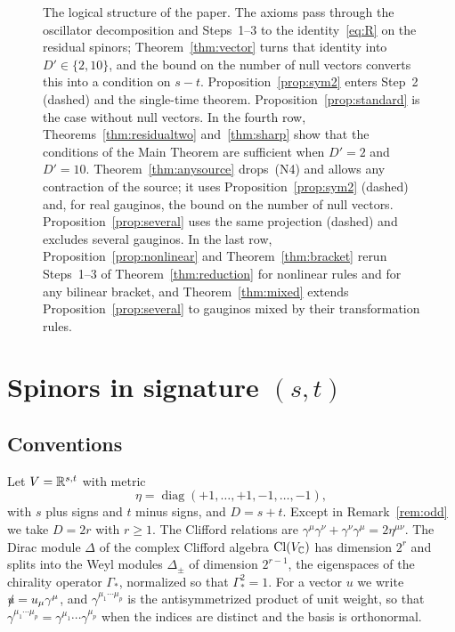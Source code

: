 \begin{figure}[t]
\caption{The logical structure of the paper. The axioms pass through the oscillator decomposition and Steps~1--3 to the identity~\eqref{eq:R} on the residual spinors; Theorem~\ref{thm:vector} turns that identity into $D'\in\{2,10\}$, and the bound on the number of null vectors converts this into a condition on $s-t$. Proposition~\ref{prop:sym2} enters Step~2 (dashed) and the single-time theorem. Proposition~\ref{prop:standard} is the case without null vectors. In the fourth row, Theorems~\ref{thm:residualtwo} and~\ref{thm:sharp} show that the conditions of the Main Theorem are sufficient when $D'=2$ and $D'=10$. Theorem~\ref{thm:anysource} drops~(N4) and allows any contraction of the source; it uses Proposition~\ref{prop:sym2} (dashed) and, for real gauginos, the bound on the number of null vectors. Proposition~\ref{prop:several} uses the same projection (dashed) and excludes several gauginos. In the last row, Proposition~\ref{prop:nonlinear} and Theorem~\ref{thm:bracket} rerun Steps~1--3 of Theorem~\ref{thm:reduction} for nonlinear rules and for any bilinear bracket, and Theorem~\ref{thm:mixed} extends Proposition~\ref{prop:several} to gauginos mixed by their transformation rules.}
\label{fig:proofmap}
\end{figure}

\section{Spinors in signature \texorpdfstring{$(s,t)$}{(s,t)}}
\label{sec:spinors}

\subsection{Conventions}

Let $V=\mathbb{R}^{s,t}$ with metric
\[
\eta=\operatorname{diag}(+1,\dots,+1,-1,\dots,-1),
\]
with $s$ plus signs and $t$ minus signs, and $D=s+t$. Except in Remark~\ref{rem:odd} we take $D=2r$ with $r\ge1$. The Clifford relations are $\gamma^\mu\gamma^\nu+\gamma^\nu\gamma^\mu=2\eta^{\mu\nu}$. The Dirac module $\Delta$ of the complex Clifford algebra $\operatorname{Cl}(V_{\mathbb{C}})$ has dimension $2^r$ and splits into the Weyl modules $\Delta_\pm$ of dimension $2^{r-1}$, the eigenspaces of the chirality operator $\Gamma_*$, normalized so that $\Gamma_*^2=1$. For a vector $u$ we write $\slashed{u}=u_\mu\gamma^\mu$, and $\gamma^{\mu_1\cdots\mu_p}$ is the antisymmetrized product of unit weight, so that $\gamma^{\mu_1\cdots\mu_p}=\allowbreak\gamma^{\mu_1}\cdots\gamma^{\mu_p}$ when the indices are distinct and the basis is orthonormal.

